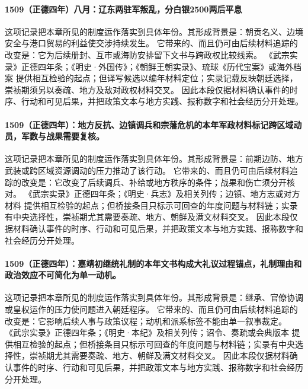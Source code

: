 \paragraph{1509（正德四年）八月：辽东两驻军叛乱，分白银2500两后平息} 这项记录把本章所见的制度运作落实到具体年份。其形成背景是：朝贡名义、边境安全与港口贸易的利益使交涉持续发生。 它带来的、而且仍可由后续材料追踪的改变是：它为后续册封、互市或海防安排留下文书与跨政权比较线索。 《武宗实录》正德四年条；《明史·外国传》；《朝鲜王朝实录》、琉球《历代宝案》或海外档案 提供相互检验的起点；但译写候选以编年材料定位；实录记载反映朝廷选择，崇祯期须另以奏疏、地方及敌对政权材料交叉。 因此本段仅据材料确认事件的时序、行动和可见后果，并把政策文本与地方实践、报称数字和社会经历分开处理。

\paragraph{1509（正德四年）：地方反抗、边镇调兵和宗藩危机的本年军政材料标记跨区域动员，军数与战果需要复核。} 这项记录把本章所见的制度运作落实到具体年份。其形成背景是：前期边防、地方武装或跨区域资源调动的压力推动了该行动。 它带来的、而且仍可由后续材料追踪的改变是：它改变了后续调兵、补给或地方秩序的条件；战果和伤亡须分开核对。 《武宗实录》正德四年条；《明史·兵志》及相关列传；边镇、地方志或对方材料 提供相互检验的起点；但桥接条目只标示可回查的年度问题与材料链；实录有中央选择性，崇祯期尤其需要奏疏、地方、朝鲜及满文材料交叉。 因此本段仅据材料确认事件的时序、行动和可见后果，并把政策文本与地方实践、报称数字和社会经历分开处理。

\paragraph{1509（正德四年）：嘉靖初继统礼制的本年文书构成大礼议过程锚点，礼制理由和政治效应不可简化为单一动机。} 这项记录把本章所见的制度运作落实到具体年份。其形成背景是：继承、官僚协调或皇权运作的压力使问题进入朝廷程序。 它带来的、而且仍可由后续材料追踪的改变是：它影响后续人事与政策议程；动机和派系标签不能由单一叙事裁定。 《武宗实录》正德四年条；《明史·本纪》及相关列传；诏令、奏疏或会典版本 提供相互检验的起点；但桥接条目只标示可回查的年度问题与材料链；实录有中央选择性，崇祯期尤其需要奏疏、地方、朝鲜及满文材料交叉。 因此本段仅据材料确认事件的时序、行动和可见后果，并把政策文本与地方实践、报称数字和社会经历分开处理。

